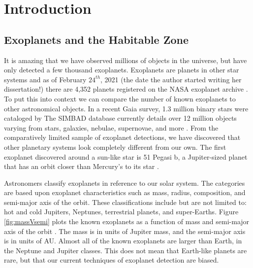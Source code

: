 \chapter{Introduction}\label{CH1}

 



\section{Exoplanets and the Habitable Zone}

 It is amazing that we have observed millions of objects in the universe, but have only detected a few thousand exoplanets. Exoplanets are planets in other star systems and as of February $24^{th}$, 2021 (the date the author started writing her dissertation!) there are 4,352 planets registered on the NASA exoplanet archive \citep{akeson2013nasa}. To put this into context we can compare the number of known exoplanets to other astronomical objects. In a recent Gaia survey, 1.3 million binary stars were cataloged by \cite{el2101million} The SIMBAD database currently details over 12 million objects varying from stars, galaxies, nebulae, supernovae, and more \citep{wenger2000simbad}. From the comparatively limited sample of exoplanet detections, we have discovered that other planetary systems look completely different from our own. The first exoplanet discovered around a sun-like star is 51 Pegasi b, a Jupiter-sized planet that has an orbit closer than Mercury's to its star \citep{mayor1995jupiter}. 

 Astronomers classify exoplanets in reference to our solar system. The categories are based upon exoplanet characteristics such as mass, radius, composition, and semi-major axis of the orbit. These classifications include but are not limited to: hot and cold Jupiters, Neptunes, terrestrial planets, and super-Earths. Figure \ref{fig:massVsemi} plots the known exoplanets as a function of mass and semi-major axis of the orbit \citep{akeson2013nasa}. The mass is in units of Jupiter mass, and the semi-major axis is in units of AU. Almost all of the known exoplanets are larger than Earth, in the Neptune and Jupiter classes. This does not mean that Earth-like planets are rare, but that our current techniques of exoplanet detection are biased.

